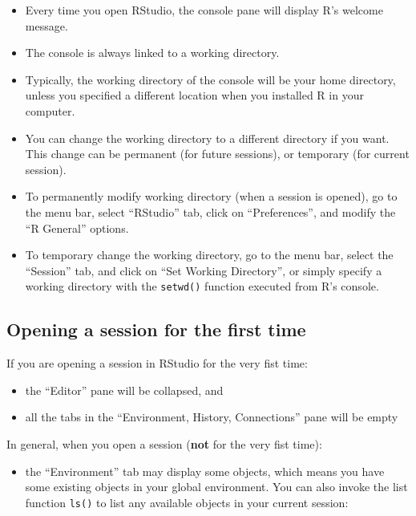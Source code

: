 \documentclass[
]{book}
\providecommand{\tightlist}{%
  \setlength{\itemsep}{0pt}\setlength{\parskip}{0pt}}
\begin{document}
\begin{itemize}
\item
  Every time you open RStudio, the console pane will display R's welcome message.
\item
  The console is always linked to a working directory.
\item
  Typically, the working directory of the console will be your home directory,
  unless you specified a different location when you installed R in your computer.
\item
  You can change the working directory to a different directory if you want.
  This change can be permanent (for future sessions), or temporary (for current
  session).
\item
  To permanently modify working directory (when a session is opened), go to the
  menu bar, select ``RStudio'' tab, click on ``Preferences'', and modify the
  ``R General'' options.
\item
  To temporary change the working directory, go to the menu bar, select the
  ``Session'' tab, and click on ``Set Working Directory'', or simply specify a
  working directory with the \texttt{setwd()} function executed from R's console.
\end{itemize}

\hypertarget{opening-a-session-for-the-first-time}{%
\subsection{Opening a session for the first time}\label{opening-a-session-for-the-first-time}}

If you are opening a session in RStudio for the very fist time:

\begin{itemize}
\item
  the ``Editor'' pane will be collapsed, and
\item
  all the tabs in the ``Environment, History, Connections'' pane will be empty
\end{itemize}

In general, when you open a session (\textbf{not} for the very fist time):

\begin{itemize}
\tightlist
\item
  the ``Environment'' tab may display some objects, which means you have some
  existing objects in your global environment. You can also invoke the list
  function \texttt{ls()} to list any available objects in your current session:
\end{itemize}
\end{document}
